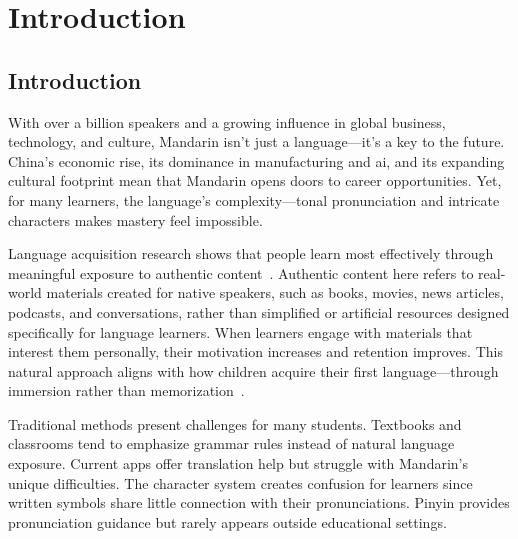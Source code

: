 \documentclass[oneside]{utmthesis}
\begin{document}
\tableofcontents
\listoftables
\listoffigures
\listofabbre
{}


\listofappendices


\mainmatter
\chapter{Introduction}
\section{Introduction}
With over a billion speakers and a growing influence in global business, technology, and culture, Mandarin isn’t just a language—it’s a key to the future. China’s economic rise, its dominance in manufacturing and ai, and its expanding cultural footprint mean that Mandarin opens doors to career opportunities. Yet, for many learners, the language’s complexity—tonal pronunciation and intricate characters makes mastery feel impossible.

Language acquisition research shows that people learn most effectively through meaningful exposure to authentic content~\citep{krashen1985,Mayer_2009}. Authentic content here refers to real-world materials created for native speakers, such as books, movies, news articles, podcasts, and conversations, rather than simplified or artificial resources designed specifically for language learners. When learners engage with materials that interest them personally, their motivation increases and retention improves. This natural approach aligns with how children acquire their first language—through immersion rather than memorization~\citep{cychosz2021, gowenlock2024}.

Traditional methods present challenges for many students. Textbooks and classrooms tend to emphasize grammar rules instead of natural language exposure. Current apps offer translation help but struggle with Mandarin's unique difficulties. The character system creates confusion for learners since written symbols share little connection with their pronunciations. Pinyin provides pronunciation guidance but rarely appears outside educational settings.
\end{document}
